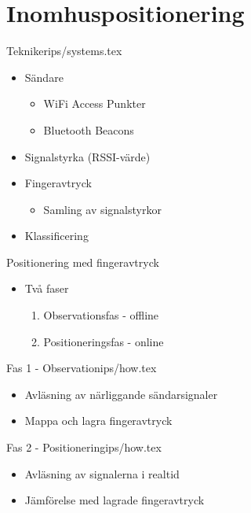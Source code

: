 \section{Inomhuspositionering}


\begin{notedFrame}{Tekniker}{ips/systems.tex}
	\begin{itemize}
		\item Sändare
			\begin{itemize}
				\item WiFi Access Punkter
				\item Bluetooth Beacons
			\end{itemize}

		\item Signalstyrka (RSSI-värde)

		\item Fingeravtryck
			\begin{itemize}
				\item Samling av signalstyrkor
			\end{itemize}

		\item Klassificering
	\end{itemize}
\end{notedFrame}


\begin{notedFrame}{Positionering med fingeravtryck}{}
	\begin{itemize}
		\item Två faser
			\begin{enumerate}
				\item Observationsfas - offline
				\item Positioneringsfas - online
			\end{enumerate}
	\end{itemize}
\end{notedFrame}


\begin{notedFrame}{Fas 1 - Observation}{ips/how.tex}
	\begin{itemize}
		\item Avläsning av närliggande sändarsignaler
		\item Mappa och lagra fingeravtryck
	\end{itemize}

\end{notedFrame}


\begin{notedFrame}{Fas 2 - Positionering}{ips/how.tex}
	\begin{itemize}
		\item Avläsning av signalerna i realtid
		\item Jämförelse med lagrade fingeravtryck
	\end{itemize}

\end{notedFrame}



